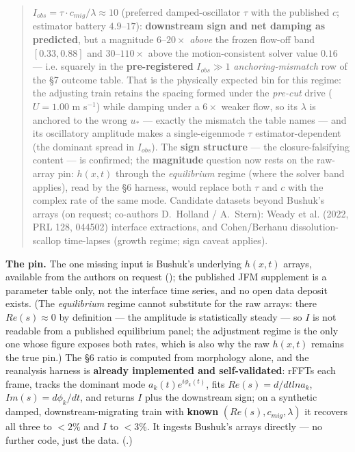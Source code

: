 \documentclass[11pt]{article}
\begin{document}
\begin{quote}
$I_{obs} = \tau \cdot c_{mig}/\lambda \approx 10$ (preferred damped-oscillator $\tau $ with the published $c$; estimator battery $4.9–17$): \textbf{downstream sign and net damping as predicted}, but a magnitude $6–20\times $ \emph{above} the frozen flow-off band $[0.33,0.88]$ and $30$–$110\times $ above the motion-consistent solver value $0.16$ — i.e. squarely in the \textbf{pre-registered} $I_{obs}\gg 1$ \emph{anchoring-mismatch} row of the §7 outcome table. That is the physically expected bin for this regime: the adjusting train retains the spacing formed under the \emph{pre-cut} drive ($U=1.00$ m s$^{-1}$) while damping under a $6\times $ weaker flow, so its $\lambda $ is anchored to the wrong $u_{*}$ — exactly the mismatch the table names — and its oscillatory amplitude makes a single-eigenmode $\tau $ estimator-dependent (the dominant spread in $I_{obs}$). The \textbf{sign structure} — the closure-falsifying content — is confirmed; the \textbf{magnitude} question now rests on the raw-array pin: $h(x,t)$ through the \emph{equilibrium} regime (where the solver band applies), read by the §6 harness, would replace both $\tau $ and $c$ with the complex rate of the same mode. Candidate datasets beyond Bushuk's arrays (on request; co-authors D.~Holland / A.~Stern): Weady et al. (2022, PRL 128, 044502) interface extractions, and Cohen/Berhanu dissolution-scallop time-lapses (growth regime; sign caveat applies).
\end{quote}


\textbf{The pin.} The one missing input is Bushuk's underlying $h(x,t)$ arrays, available from the authors on request (); the published JFM supplement is a parameter table only, not the interface time series, and no open data deposit exists. (The \emph{equilibrium} regime cannot substitute for the raw arrays: there $Re(s)\approx 0$ by definition — the amplitude is statistically steady — so $I$ is not readable from a published equilibrium panel; the adjustment regime is the only one whose figure exposes both rates, which is also why the raw $h(x,t)$ remains the true pin.) The §6 ratio is computed from morphology alone, and the reanalysis harness is \textbf{already implemented and self-validated}:  rFFTs each frame, tracks the dominant mode $a_{k}(t)e^{i\phi _{k}(t)}$, fits $Re(s)=d/dt ln a_{k}$, $Im(s)=d\phi _{k}/dt$, and returns $I$ plus the downstream sign; on a synthetic damped, downstream-migrating train with \textbf{known} $(Re(s), c_{mig}, \lambda )$ it recovers all three to $<2\%$ and $I$ to $<3\%$. It ingests Bushuk's arrays directly — no further code, just the data. (.)
\end{document}
